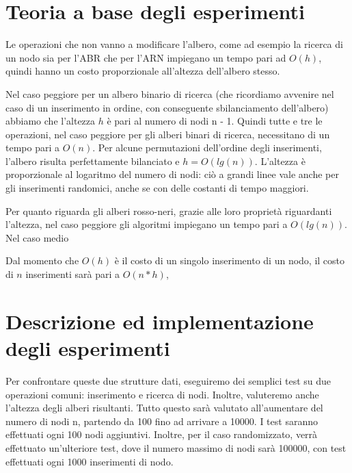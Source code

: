 \documentclass[
]{article}
\begin{document}
\hypertarget{teoria-a-base-degli-esperimenti}{%
\section{Teoria a base degli
esperimenti}\label{teoria-a-base-degli-esperimenti}}

Le operazioni che non vanno a modificare l'albero, come ad esempio la
ricerca di un nodo sia per l'ABR che per l'ARN impiegano un tempo pari
ad \({O}(h)\), quindi hanno un costo proporzionale all'altezza
dell'albero stesso.

Nel caso peggiore per un albero binario di ricerca (che ricordiamo
avvenire nel caso di un inserimento in ordine, con conseguente
sbilanciamento dell'albero) abbiamo che l'altezza \(h\) è pari al numero
di nodi n - 1. Quindi tutte e tre le operazioni, nel caso peggiore per
gli alberi binari di ricerca, necessitano di un tempo pari a \({O}(n)\).
Per alcune permutazioni dell'ordine degli inserimenti, l'albero risulta
perfettamente bilanciato e \(h = {O}(lg(n))\). L'altezza è proporzionale
al logaritmo del numero di nodi: ciò a grandi linee vale anche per gli
inserimenti randomici, anche se con delle costanti di tempo maggiori.

Per quanto riguarda gli alberi rosso-neri, grazie alle loro proprietà
riguardanti l'altezza, nel caso peggiore gli algoritmi impiegano un
tempo pari a \({O}(lg(n))\). Nel caso medio

Dal momento che \({O}(h)\) è il costo di un singolo inserimento di un
nodo, il costo di \(n\) inserimenti sarà pari a \({O}(n*h)\),

\hypertarget{descrizione-ed-implementazione-degli-esperimenti}{%
\section{Descrizione ed implementazione degli
esperimenti}\label{descrizione-ed-implementazione-degli-esperimenti}}

Per confrontare queste due strutture dati, eseguiremo dei semplici test
su due operazioni comuni: inserimento e ricerca di nodi. Inoltre,
valuteremo anche l'altezza degli alberi risultanti. Tutto questo sarà
valutato all'aumentare del numero di nodi n, partendo da 100 fino ad
arrivare a 10000. I test saranno effettuati ogni 100 nodi aggiuntivi.
Inoltre, per il caso randomizzato, verrà effettuato un'ulteriore test,
dove il numero massimo di nodi sarà 100000, con test effettuati ogni
1000 inserimenti di nodo.
\end{document}
